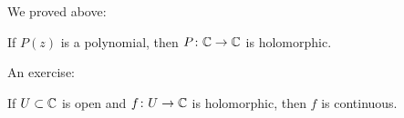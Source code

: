 \documentclass[10pt,aspectratio=169]{beamer}
\begin{document}
\begin{frame}

We proved above:

\begin{proposition}
If $P(z)$ is a polynomial, then $P \colon {\mathbb{C}} \to {\mathbb{C}}$ is holomorphic.
\end{proposition}
\pause

An exercise:

\begin{proposition}
If $U \subset {\mathbb{C}}$ is open and $f \colon U \to {\mathbb{C}}$ is holomorphic, then $f$
is continuous.
\end{proposition}

\end{frame}
\end{document}

